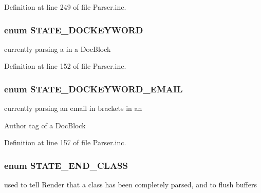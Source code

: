 \-Definition at line 249 of file \-Parser.\-inc.

\hypertarget{_parser_8inc_a25792634000549efa34ae154864df04d}{
\subsubsection[{\-S\-T\-A\-T\-E\-\_\-\-D\-O\-C\-K\-E\-Y\-W\-O\-R\-D}]{\setlength{\rightskip}{0pt plus 5cm}enum {\bf \-S\-T\-A\-T\-E\-\_\-\-D\-O\-C\-K\-E\-Y\-W\-O\-R\-D}}}\label{_parser_8inc_a25792634000549efa34ae154864df04d}
currently parsing a  in a \-Doc\-Block 

\-Definition at line 152 of file \-Parser.\-inc.

\hypertarget{_parser_8inc_a3319b7e7e64cf25fd17bfdce57578737}{
\subsubsection[{\-S\-T\-A\-T\-E\-\_\-\-D\-O\-C\-K\-E\-Y\-W\-O\-R\-D\-\_\-\-E\-M\-A\-I\-L}]{\setlength{\rightskip}{0pt plus 5cm}enum {\bf \-S\-T\-A\-T\-E\-\_\-\-D\-O\-C\-K\-E\-Y\-W\-O\-R\-D\-\_\-\-E\-M\-A\-I\-L}}}\label{_parser_8inc_a3319b7e7e64cf25fd17bfdce57578737}
currently parsing an email in brackets in an \begin{DoxyAuthor}{\-Author}
tag of a \-Doc\-Block 
\end{DoxyAuthor}


\-Definition at line 157 of file \-Parser.\-inc.

\hypertarget{_parser_8inc_a2b19a1f2786c4d39b4e350fea2302db2}{
\subsubsection[{\-S\-T\-A\-T\-E\-\_\-\-E\-N\-D\-\_\-\-C\-L\-A\-S\-S}]{\setlength{\rightskip}{0pt plus 5cm}enum {\bf \-S\-T\-A\-T\-E\-\_\-\-E\-N\-D\-\_\-\-C\-L\-A\-S\-S}}}\label{_parser_8inc_a2b19a1f2786c4d39b4e350fea2302db2}
used to tell \-Render that a class has been completely parsed, and to flush buffers 


